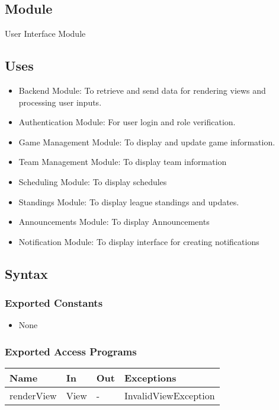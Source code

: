 \documentclass[12pt, titlepage]{article}
\begin{document}
\subsection{Module}

User Interface Module

\subsection{Uses}

\begin{itemize}
    \item Backend Module: To retrieve and send data for rendering views and processing user inputs.
    \item Authentication Module: For user login and role verification.
    \item Game Management Module: To display and update game information.
    \item Team Management Module: To display team information
    \item Scheduling Module: To display schedules
    \item Standings Module: To display league standings and updates.
    \item Announcements Module: To display Announcements
    \item Notification Module: To display interface for creating notifications
\end{itemize}

\subsection{Syntax}

\subsubsection{Exported Constants}

\begin{itemize}
    \item None
\end{itemize}

\subsubsection{Exported Access Programs}

\begin{center}
  \begin{tabularx}{\textwidth}{|l|X|X|X|}
  \hline
  \textbf{Name} & \textbf{In} & \textbf{Out} & \textbf{Exceptions} \\
  \hline
  renderView & View & - & InvalidViewException \\
  \hline
  \end{tabularx}
\end{center}
\end{document}
